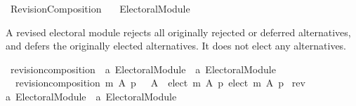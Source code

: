 %
\begin{isabellebody}%
%
%
\isadelimdocument
\isanewline
%
\endisadelimdocument
%
\isatagdocument
\isanewline
\isanewline
%
\isamarkuptrue%
%
\endisatagdocument
{\isafolddocument}%
%
\isadelimdocument
%
\endisadelimdocument
%
\isadelimtheory
%
\endisadelimtheory
%
\isatagtheory
{}\isamarkupfalse%
\ Revision{\isacharunderscore}{\kern0pt}Composition\isanewline
\ \ \ {\isachardoublequoteopen}{\isachardot}{\kern0pt}{\isachardot}{\kern0pt}{\isacharslash}{\kern0pt}Electoral{\isacharunderscore}{\kern0pt}Module{\isachardoublequoteclose}\isanewline
{}%
\endisatagtheory
{\isafoldtheory}%
%
\isadelimtheory
%
\endisadelimtheory
%
\begin{isamarkuptext}%
A revised electoral module rejects all originally rejected or deferred
alternatives, and defers the originally elected alternatives.
It does not elect any alternatives.%
\end{isamarkuptext}\isamarkuptrue%
%
\isadelimdocument
%
\endisadelimdocument
%
\isatagdocument
%
\isamarkuptrue%
%
\endisatagdocument
{\isafolddocument}%
%
\isadelimdocument
%
\endisadelimdocument
{}\isamarkupfalse%
\ revision{\isacharunderscore}{\kern0pt}composition\ {\isacharcolon}{\kern0pt}{\isacharcolon}{\kern0pt}\ {\isachardoublequoteopen}{\isacharprime}{\kern0pt}a\ Electoral{\isacharunderscore}{\kern0pt}Module\ {\isasymRightarrow}\ {\isacharprime}{\kern0pt}a\ Electoral{\isacharunderscore}{\kern0pt}Module{\isachardoublequoteclose}\ \isanewline
\ \ {\isachardoublequoteopen}revision{\isacharunderscore}{\kern0pt}composition\ m\ A\ p\ {\isacharequal}{\kern0pt}\ {\isacharparenleft}{\kern0pt}{\isacharbraceleft}{\kern0pt}{\isacharbraceright}{\kern0pt}{\isacharcomma}{\kern0pt}\ A\ {\isacharminus}{\kern0pt}\ elect\ m\ A\ p{\isacharcomma}{\kern0pt}\ elect\ m\ A\ p{\isacharparenright}{\kern0pt}{\isachardoublequoteclose}\isanewline
\isanewline
{}\isamarkupfalse%
\ rev\ {\isacharcolon}{\kern0pt}{\isacharcolon}{\kern0pt}\isanewline
{\isachardoublequoteopen}{\isacharprime}{\kern0pt}a\ Electoral{\isacharunderscore}{\kern0pt}Module\ {\isasymRightarrow}\ {\isacharprime}{\kern0pt}a\ Electoral{\isacharunderscore}{\kern0pt}Module{\isachardoublequoteclose}\ {\isacharparenleft}{\kern0pt}{\isachardoublequoteopen}{\isacharunderscore}{\kern0pt}{\isasymdown}{\isachardoublequoteclose}\ {}{}{\isacharparenright}{\kern0pt}\ \isanewline

\end{isabellebody}

